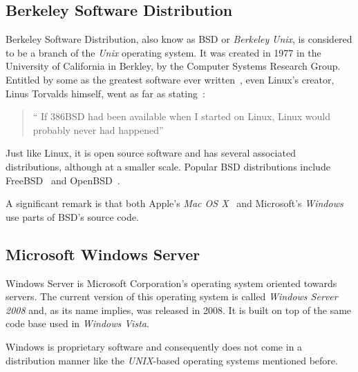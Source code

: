 \subsection{Berkeley Software Distribution}
Berkeley Software Distribution, also know as BSD or \textit{Berkeley} \textit{Unix}, is considered to be a branch of the \textit{Unix} operating system. It was created in 1977 in the University of California in Berkley, by the Computer Systems Research Group.  Entitled by some as the greatest software ever written~\cite{ greatest_software_ever_written}, even Linux's creator, Linus Torvalds himself, went as far as stating~\cite{ interview_linus}: 
\begin{quote}
  `` If 386BSD had been available when I started on Linux, Linux would probably never had happened''
\end{quote}
Just like Linux, it is open source software and has several associated distributions, although at a smaller scale. Popular BSD distributions include FreeBSD~\cite{freebsd} and OpenBSD~\cite{openbsd}.

A significant remark is that both Apple's \textit{Mac OS X}~\cite{ leopard_os_foundations} and Microsoft's \textit{Windows}~\cite{ bsd_code_windows} use parts of BSD's source code.

\subsection{Microsoft Windows Server}
Windows Server is Microsoft Corporation's operating system oriented towards servers. The current version of this operating system is called \textit{Windows Server 2008} and, as its name implies, was released in 2008. It is built on top of the same code base used in \textit{Windows Vista}.

Windows is proprietary software and consequently does not come in a distribution manner like the \textit{UNIX}-based operating systems mentioned before.

